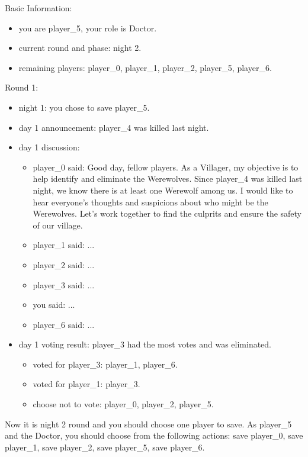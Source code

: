 \begin{tcolorbox}
{\ttfamily\small
Basic Information:
\begin{itemize}
    \item you are player\_5, your role is Doctor.
    \item current round and phase: night 2.
    \item remaining players: player\_0, player\_1, player\_2, player\_5, player\_6.
\end{itemize}
Round 1:
\begin{itemize}
    \item night 1: you chose to save player\_5.
    \item day 1 announcement: player\_4 was killed last night.
    \item day 1 discussion:
    \begin{itemize}
        \item player\_0 said: Good day, fellow players. As a Villager, my objective is to help identify and eliminate the Werewolves. Since player\_4 was killed last night, we know there is at least one Werewolf among us. I would like to hear everyone's thoughts and suspicions about who might be the Werewolves. Let's work together to find the culprits and ensure the safety of our village.
        \item player\_1 said: ...
        \item player\_2 said: ...
        \item player\_3 said: ...
        \item you said: ...
        \item player\_6 said: ...
    \end{itemize}
\end{itemize}
\begin{itemize}
    \item day 1 voting result: player\_3 had the most votes and was eliminated. 
    \begin{itemize}
        \item voted for player\_3: player\_1, player\_6.
        \item voted for player\_1: player\_3.
        \item choose not to vote: player\_0, player\_2, player\_5.
    \end{itemize}
\end{itemize}

Now it is night 2 round and you should choose one player to save. As player\_5 and the Doctor, you should choose from the following actions: save player\_0, save player\_1, save player\_2, save player\_5, save player\_6.
}
\end{tcolorbox}

